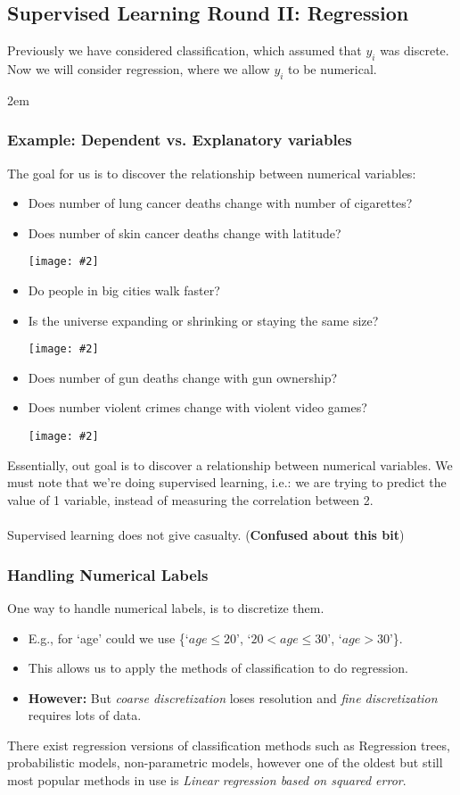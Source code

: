 \documentclass{article}
\def\blu#1{{\color{blu}#1}}
\def\red#1{{\color{red}#1}}
\theoremstyle{definition}
\newcommand{\centerfig}[2]{\begin{center}\texttt{[image: \#2]}\end{center}}
\begin{document}
\subsection*{Supervised Learning Round II: Regression}
Previously we have considered classification, which assumed that $ y_i $ was discrete. Now we will consider regression, where we allow $ y_i $ to be numerical. 

\begingroup
\leftskip 2em
\subsubsection*{Example: Dependent vs. Explanatory variables}
The goal for us is to discover the relationship between numerical variables:
\begin{itemize}
	\item Does number of lung cancer deaths change with number of cigarettes?
	\item Does number of skin cancer deaths change with latitude?
	\centerfig{0.85}{Pic26}
	\item Do people in big cities walk faster?
	\item Is the universe expanding or shrinking or staying the same size?
	\centerfig{0.85}{Pic27}
	\item Does number of gun deaths change with gun ownership?
	\item Does number violent crimes change with violent video games?
	\centerfig{0.90}{Pic28}
\end{itemize}

\endgroup
\noindent Essentially, out goal is to discover a relationship between numerical variables. We must note that we're doing supervised learning, i.e.: we are trying to predict the value of 1 variable, instead of measuring the correlation between 2.  \\\\
Supervised learning \red{does not give casualty}. (\textbf{Confused about this bit})

\subsubsection*{Handling Numerical Labels}
One way to handle numerical labels, is to \blu{discretize} them.
\begin{itemize}
	\item E.g., for ‘age’ could we use \{‘$ age \leq 20 $’, ‘$ 20 < age \leq 30 $’, ‘$ age > 30 $’\}.
	\item This allows us to apply the methods of classification to do regression. 
	\item \textbf{However:} But \textit{\red{coarse discretization}} loses resolution and \textit{\red{fine discretization}} requires lots of data.
\end{itemize}
There exist regression versions of classification methods such as Regression trees, probabilistic models, non-parametric models, however one of the oldest but still most popular methods in use is \blu{\textit{Linear regression based on squared error}}.
\end{document}
